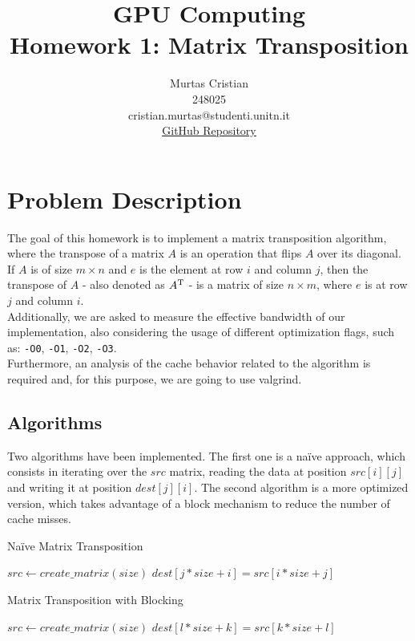 \documentclass{article}
\title{\textbf{GPU Computing} \\
    \large Homework 1: Matrix Transposition \\
}
\author{Murtas Cristian \\ 248025 \\ cristian.murtas@studenti.unitn.it \\
\underline{\href{https://github.com/SecondarySkyler/gpu-computing/tree/main/matrix_transposition}{GitHub Repository}}
}
\begin{document}
\maketitle

\section{Problem Description}
The goal of this homework is to implement a matrix transposition algorithm, where the transpose of a matrix $A$
is an operation that flips $A$ over its diagonal. 
If $A$ is of size $m \times n$ and $e$ is the element at row $i$ and column $j$, then the transpose of $A$ - also denoted as $A\textsuperscript{T}$ - 
is a matrix of size $n \times m$, where $e$ is at row $j$ and column $i$.  \\
Additionally, we are asked to measure the effective bandwidth of our implementation, also considering  the
usage of different optimization flags, such as: \texttt{-O0}, \texttt{-O1}, \texttt{-O2}, \texttt{-O3}. \\
Furthermore, an analysis of the cache behavior related to the algorithm is required and, for this purpose, we are going to use
valgrind.
\subsection{Algorithms}
Two algorithms have been implemented. The first one is a na\"{i}ve approach, which
consists in iterating over the $src$ matrix, reading the data at position $src[i][j]$ and writing it at position $dest [j][i]$. The second algorithm is a more optimized version, which takes advantage of a block mechanism to reduce the number of cache misses.
\begin{algorithm}
    \caption{Na\"{i}ve Matrix Transposition}
    \begin{algorithmic}[1]
        \State $src \gets create\_matrix(size)$
                \State $dest[j * size + i] = src[i * size + j]$
            \EndFor
        \EndFor
    \end{algorithmic}
\end{algorithm}
\begin{algorithm}
    \caption{Matrix Transposition with Blocking}
    \begin{algorithmic}[1]
        \State $src \gets create\_matrix(size)$
                 
                        \State $dest[l * size + k] = src[k * size + l]$
                    \EndFor
                \EndFor
            \EndFor
        \EndFor
    \end{algorithmic}
\end{algorithm}
\end{document}
